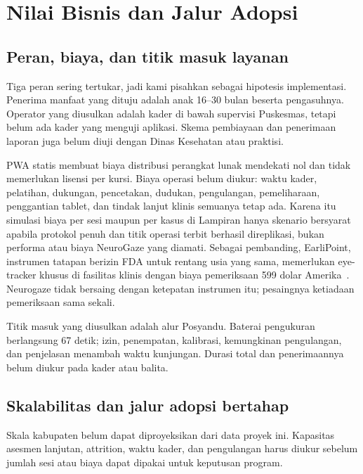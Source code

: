 \documentclass{article}
\begin{document}
\section{Nilai Bisnis dan Jalur Adopsi}

\subsection{Peran, biaya, dan titik masuk layanan}

Tiga peran sering tertukar, jadi kami pisahkan sebagai hipotesis implementasi. Penerima
manfaat yang dituju adalah anak 16--30 bulan beserta pengasuhnya. Operator yang diusulkan
adalah kader di bawah supervisi Puskesmas, tetapi belum ada kader yang menguji aplikasi.
Skema pembiayaan dan penerimaan laporan juga belum diuji dengan Dinas Kesehatan atau
praktisi.

PWA statis membuat biaya distribusi perangkat lunak mendekati nol dan tidak memerlukan
lisensi per kursi. Biaya operasi belum diukur: waktu kader, pelatihan, dukungan, pencetakan,
dudukan, pengulangan, pemeliharaan, penggantian tablet, dan tindak lanjut klinis semuanya
tetap ada. Karena itu simulasi biaya per sesi maupun per kasus di Lampiran hanya skenario
bersyarat apabila protokol penuh dan titik operasi terbit berhasil direplikasi, bukan
performa atau biaya NeuroGaze yang diamati. Sebagai pembanding, EarliPoint, instrumen tatapan
berizin FDA untuk rentang usia yang sama, memerlukan eye-tracker khusus di fasilitas klinis
dengan biaya pemeriksaan 599 dolar Amerika~\cite{earlipoint2026}. Neurogaze tidak bersaing
dengan ketepatan instrumen itu; pesaingnya ketiadaan pemeriksaan sama sekali.

Titik masuk yang diusulkan adalah alur Posyandu. Baterai pengukuran berlangsung 67 detik;
izin, penempatan, kalibrasi, kemungkinan pengulangan, dan penjelasan menambah waktu
kunjungan. Durasi total dan penerimaannya belum diukur pada kader atau balita.

\subsection{Skalabilitas dan jalur adopsi bertahap}

Skala kabupaten belum dapat diproyeksikan dari data proyek ini. Kapasitas asesmen lanjutan,
attrition, waktu kader, dan pengulangan harus diukur sebelum jumlah sesi atau biaya dapat
dipakai untuk keputusan program.
\end{document}
